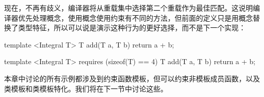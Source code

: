 现在，不再有歧义，编译器将从重载集中选择第二个重载作为最佳匹配。这说明编译器优先处理概念，使用概念使用约束有不同的方法，但前面的定义只是用概念替换了类型特征，所以可以说是演示这种行为的更好选择，而不是下一个实现：

\begin{cppcode}
template <Integral T>
T add(T a, T b)
{
	return a + b;
}

template <Integral T>
requires (sizeof(T) == 4)
T add(T a, T b)
{
	return a + b;
}
\end{cppcode}

本章中讨论的所有示例都涉及到约束函数模板，但可以约束非模板成员函数，以及类模板和类模板特化。我们将在下一节中讨论这些。





























